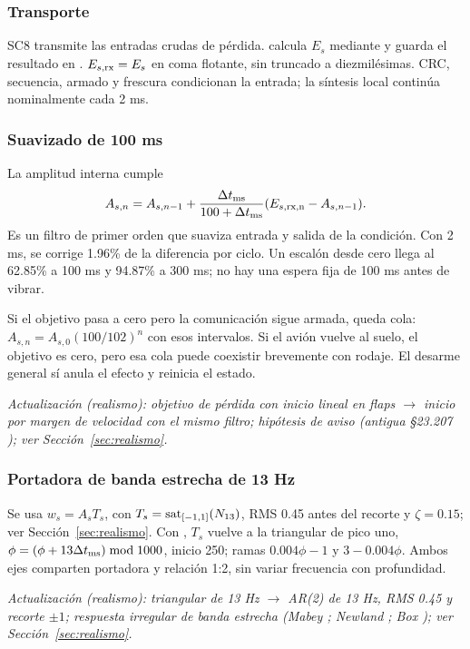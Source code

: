 \subsubsection{Transporte}
SC8 transmite las entradas crudas de pérdida.  calcula $E_s$ mediante  y guarda el resultado en . $E_{s,\rm rx}=E_s$ en coma flotante, sin truncado a diezmilésimas. CRC, secuencia, armado y frescura condicionan la entrada; la síntesis local continúa nominalmente cada 2 ms.

\subsubsection{Suavizado de 100 ms}
La amplitud interna cumple
\begin{equation}
A_{s,n}=A_{s,n-1}+\frac{\Delta t_{\rm ms}}{100+\Delta t_{\rm ms}}
(E_{s,\rm rx,n}-A_{s,n-1}).
\end{equation}
Es un filtro de primer orden que suaviza entrada y salida de la condición. Con 2 ms, se corrige 1.96\% de la diferencia por ciclo. Un escalón desde cero llega al 62.85\% a 100 ms y 94.87\% a 300 ms; no hay una espera fija de 100 ms antes de vibrar.

Si el objetivo pasa a cero pero la comunicación sigue armada, queda cola: $A_{s,n}=A_{s,0}(100/102)^n$ con esos intervalos. Si el avión vuelve al suelo, el objetivo es cero, pero esa cola puede coexistir brevemente con rodaje. El desarme general sí anula el efecto y reinicia el estado.


\textit{Actualización (realismo): objetivo de pérdida con inicio lineal en flaps $\rightarrow$ inicio por margen de velocidad con el mismo filtro; hipótesis de aviso (antigua §23.207 \cite{cfr23}); ver Sección~\ref{sec:realismo}.}

\subsubsection{Portadora de banda estrecha de 13 Hz}
Se usa $w_s=A_sT_s$, con $T_s=\operatorname{sat}_{[-1,1]}(N_{13})$, RMS 0.45 antes del recorte y $\zeta=0.15$; ver Sección~\ref{sec:realismo}. Con , $T_s$ vuelve a la triangular de pico uno, $\phi=(\phi+13\Delta t_{\rm ms})\bmod1000$, inicio 250; ramas $0.004\phi-1$ y $3-0.004\phi$. Ambos ejes comparten portadora y relación 1:2, sin variar frecuencia con profundidad.

\textit{Actualización (realismo): triangular de 13 Hz $\rightarrow$ AR(2) de 13 Hz, RMS 0.45 y recorte $\pm1$; respuesta irregular de banda estrecha (Mabey \cite{mabey1988}; Newland \cite{newland1993}; Box \cite{box}); ver Sección~\ref{sec:realismo}.}

